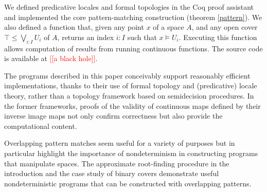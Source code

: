 \documentclass[conference]{IEEEtran}
\newcommand{\note}[1]{\textcolor{red}{[[{#1}]]}}
\newcommand{\grammar}[1]{\textcolor{red}{\underline{#1}}}
\newcommand{\FutureWork}[1]{}
\begin{document}
We defined predicative locales and formal topologies in the Coq proof assistant and implemented the core pattern-matching construction (theorem \ref{pattern}). We also defined a function that, given any point $x$ of a space $A$, and any open cover $\top \le \bigvee_{i : I} U_i$ of $A$, returns an index $i : I$ such that $x \models U_i$. Executing this function allows computation of results from running continuous functions. The source code is available at \note{a black hole}.

The programs described in this paper conceivably support reasonably efficient implementations, thanks to their use of formal topology and (predicative) locale theory, rather than a topology framework based on semidecision procedures. In the former frameworks, proofs of the validity of continuous maps defined by their inverse image maps not only confirm correctness but also provide the computational content.

Overlapping pattern matches seem useful for a variety of purposes but in particular highlight the  importance of nondeterminism in constructing programs that manipulate spaces. The approximate root-finding procedure in the introduction and the case study of binary covers demonstrate useful nondeterministic programs that can be constructed with overlapping patterns.


\FutureWork{A possible direction of future work would be to extend overlapping patterns to the gros topos $\mathcal{E}$ over \textbf{FSpc} with the previously described open cover topology. For instance, we might want to have an overlapping pattern match that nondeterministically returns a \emph{function}, rather than simply a point of a space. Since \textbf{Spc} and \textbf{FSpc} lack exponentials in general, making sense of \grammar{this} would require extending the constructs defined here to $\mathcal{E}$.}









\end{document}
